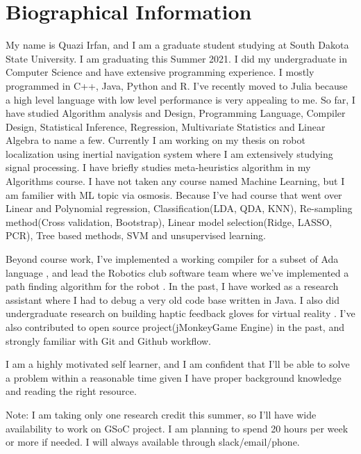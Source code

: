 \documentclass{article}
\begin{document}
\section{Biographical Information}
My name is Quazi Irfan, and I am a graduate student studying at South Dakota State University. I am graduating this Summer 2021. I did my undergraduate in Computer Science and have extensive programming experience. I mostly programmed in C++, Java, Python and R. I've recently moved to Julia because a high level language with low level performance is very appealing to me. So far, I have studied Algorithm analysis and Design, Programming Language, Compiler Design, Statistical Inference, Regression, Multivariate Statistics and Linear Algebra to name a few. Currently I am working on my thesis on robot localization using inertial navigation system where I am extensively studying signal processing. I have briefly studies meta-heuristics algorithm in my Algorithms course. I have not taken any course named Machine Learning, but I am familier with ML topic via osmosis. Because I've had course that went over Linear and Polynomial regression, Classification(LDA, QDA, KNN), Re-sampling method(Cross validation, Bootstrap), Linear model selection(Ridge, LASSO, PCR), Tree based methods, SVM and unsupervised learning.

Beyond course work, I've implemented a working compiler for a subset of Ada language \cite{quazi_2021}, and lead the Robotics club software team where we've implemented a path finding algorithm for the robot \cite{irfan}. In the past, I have worked as a research assistant where I had to debug a very old code base written in Java. I also did undergraduate research on building haptic feedback gloves for virtual reality \cite{irfan2018building}. I've also contributed to open source project(jMonkeyGame Engine) in the past, and strongly familiar with Git and Github workflow.

I am a highly motivated self learner, and I am confident that I'll be able to solve a problem within a reasonable time given I have proper background knowledge and reading the right resource.

Note: I am taking only one research credit this summer, so I'll have wide availability to work on GSoC project. I am planning to spend 20 hours per week or more if needed. I will always available through slack/email/phone.

\pagebreak
\printbibliography
\end{document}
